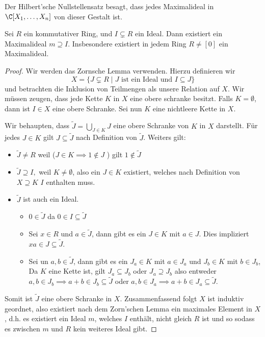 \begin{remark}
	Der Hilbert'sche Nullstellensatz besagt, dass jedes Maximalideal in $\C[X_1,\ldots,X_{n}]$ von dieser Gestalt ist.
\end{remark}

\begin{theorem}
	Sei $R$ ein kommutativer Ring, und $I \subsetneq R$ ein Ideal. Dann existiert ein Maximalideal $m \supseteq I$.
	Insbesondere existiert in jedem Ring $R \neq [0]$ ein Maximalideal.
\end{theorem}

\begin{proof}
	Wir werden das Zornsche Lemma verwenden. Hierzu definieren wir
	\[
	X = \{J \subsetneq R \mid J \text{ ist ein Ideal und } I \subseteq J\} 
	\]
	und betrachten die Inklusion von Teilmengen als unsere Relation auf $X$.
	Wir müssen zeugen, dass jede Kette $K$ in $X$ eine obere schranke besitzt.
	Falls $K = \emptyset$, dann ist $I \in X$ eine obere Schranke.
	Sei nun $K$ eine nichtleere Kette in $X$.
	
	Wir behaupten, dass $\widetilde{J} = \bigcup_{J \in K} J$ eine obere Schranke von $K$ in $X$ darstellt.
	Für jedes $J \in K$ gilt $J \subseteq \widetilde{J}$ nach Definition von $\widetilde{J}$.
	Weiters gilt:
	\begin{itemize}
		\item $\widetilde{J} \neq R$ weil ($J \in K \implies 1 \not\in J$ ) gilt $1 \not\in \widetilde{J}$ 
		\item $\widetilde{J} \supseteq I,$ weil $K \neq \emptyset$, also ein $J \in K$ existiert, welches nach Definition von $X \supseteq K$ $I$ enthalten muss.
		\item $\widetilde{J}$ ist auch ein Ideal.
			\begin{itemize}
				\item $0 \in \widetilde{J}$ da $0 \in I \subseteq \widetilde{J}$ 
				\item Sei $x \in R$ und $a \in \widetilde{J}$, dann gibt es ein $J \in K$ mit $a \in J$.
					Dies impliziert $xa \in J \subseteq \widetilde{J}$.
				\item Sei un $a,b \in \widetilde{J}$, dann gibt es ein $J_{a} \in K$ mit $a \in J_{a}$ und $J_{b} \in K$ mit $b \in J_{b}$,
					Da $K$ eine Kette ist, gilt $J_{a} \subseteq J_{b}$ oder $J_{a} \supseteq J_{b}$ also entweder $a,b \in J_{b} \implies a + b \in J_{b} \subseteq \widetilde{J}$ oder
					$a,b \in J_{a} \implies a+b \in J_{a} \subseteq \widetilde{J}$.
			\end{itemize}
	\end{itemize}
	Somit ist $\widetilde{J}$ eine obere Schranke in $X$.
	Zusammenfassend folgt $X$ ist induktiv geordnet, also existiert nach dem Zorn'schen Lemma ein maximales Element in $X$, d.h. es existiert ein Ideal $m$,
	welches  $I$ enthält, nicht gleich $R$ ist und so sodass es zwischen $m$ und $R$ kein weiteres Ideal gibt.
\end{proof}

